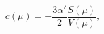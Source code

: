 \begin{equation}
c(\mu) = -\frac{3\alpha'}2\frac{S(\mu)}{V(\mu)},
    \label{c=action}
\end{equation}

